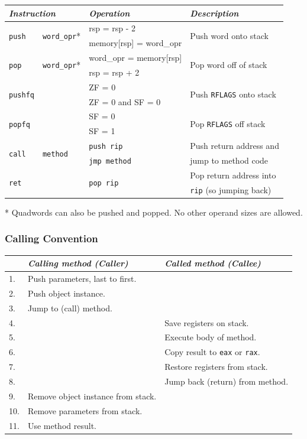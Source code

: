 \documentclass[twocolumn,english]{article}
\providecommand{\tabularnewline}{\\}
\begin{document}
\begin{table}[H]
\noindent \centering{}\texttt{\footnotesize{}}%
\begin{tabular}{llll}
\toprule 
\multicolumn{2}{l}{\emph{Instruction}} & \emph{Operation} & \emph{Description}\tabularnewline
\midrule
\multirow{2}{*}{\texttt{push}} & \multirow{2}{*}{\texttt{word\_opr}{*}} & rsp = rsp - 2 & \multirow{2}{*}{Push word onto stack}\tabularnewline
 &  & memory{[}rsp{]} = word\_opr & \tabularnewline
\multirow{2}{*}{\texttt{pop}} & \multirow{2}{*}{\texttt{word\_opr}{*}} & word\_opr = memory{[}rsp{]} & \multirow{2}{*}{Pop word off of stack}\tabularnewline
 &  & rsp = rsp + 2 & \tabularnewline
\multirow{2}{*}{\texttt{pushfq}} & \multirow{2}{*}{} & ZF = 0 & \multirow{2}{*}{Push \texttt{RFLAGS} onto stack}\tabularnewline
 &  & ZF = 0 and SF = 0 & \tabularnewline
\multirow{2}{*}{\texttt{popfq}} & \multirow{2}{*}{} & SF = 0 & \multirow{2}{*}{Pop \texttt{RFLAGS} off stack}\tabularnewline
 &  & SF = 1 & \tabularnewline
\multirow{2}{*}{\texttt{call}} & \multirow{2}{*}{\texttt{method}} & \texttt{push rip} & Push return address and\tabularnewline
 &  & \texttt{jmp method} & jump to method code\tabularnewline
\multirow{2}{*}{\texttt{ret}} & \multirow{2}{*}{} & \multirow{2}{*}{\texttt{pop rip}} & Pop return address into\tabularnewline
 &  &  & \texttt{rip} (so jumping back)\tabularnewline
\bottomrule
\end{tabular}
\end{table}


{*} Quadwords can also be pushed and popped. No other operand sizes
are allowed.


\subsubsection{Calling Convention}

\begin{table}[H]
\noindent \centering{}{\footnotesize{}}%
\begin{tabular}{lll}
\toprule 
\multicolumn{1}{l}{} & \emph{Calling method (Caller)} & \emph{Called method (Callee)}\tabularnewline
\midrule
1. & Push parameters, last to first. & \tabularnewline
2. & Push object instance. & \tabularnewline
3. & Jump to (call) method. & \tabularnewline
4. &  & Save registers on stack.\tabularnewline
5. &  & Execute body of method.\tabularnewline
6. &  & Copy result to \texttt{eax} or \texttt{rax}.\tabularnewline
7. &  & Restore registers from stack.\tabularnewline
8. &  & Jump back (return) from method.\tabularnewline
9. & Remove object instance from stack. & \multirow{1}{*}{}\tabularnewline
10. & Remove parameters from stack. & \tabularnewline
11. & Use method result. & \tabularnewline
\bottomrule
\end{tabular}
\end{table}
\end{document}
